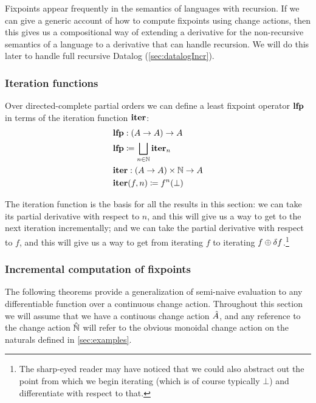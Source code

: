 
Fixpoints appear frequently in the semantics of languages with recursion. If we
can give a generic account of how to compute fixpoints using change actions,
then this gives us a compositional way of extending a derivative for the
non-recursive semantics of a language to a derivative that can handle recursion.
We will do this later to handle full recursive Datalog (\cref{sec:datalogIncr}).

\subsubsection{Iteration functions}
\label{sec:iteration}

Over directed-complete partial orders we can define a least fixpoint operator $\mathbf{lfp}$ in terms of the
iteration function $\mathbf{iter}$:
\begin{align*}
  &\mathbf{lfp} : (A \rightarrow A) \rightarrow A\\
  &\mathbf{lfp} \coloneqq \bigsqcup_{n \in \mathbb{N}} \mathbf{iter}_n \\
  &\mathbf{iter} : (A \rightarrow A) \times \mathbb{N} \rightarrow A\\
  &\mathbf{iter}(f, n) \coloneqq f^n(\bot)
\end{align*}

The iteration function is the basis for all the results in this section:
we can take its partial derivative with respect to $n$, and this will give us a way to get
to the next iteration incrementally; and we can take the partial derivative
with respect to $f$, and this will give us a way to get from iterating $f$ to iterating $f
\oplus \delta f$.\footnote{
  The sharp-eyed reader may have noticed that we
  could also abstract out the point from which we begin iterating (which is of
  course typically $\bot$) and differentiate with respect to that.
}

\subsubsection{Incremental computation of fixpoints}

The following theorems provide a
generalization of semi-naive evaluation to any differentiable function over a
continuous change action. Throughout this section we will assume that we have a contiuous change action
$\hat{A}$, and any reference to the change action $\hat{\mathbb{N}}$ will refer to the obvious monoidal
change action on the naturals defined in \cref{sec:examples}.

